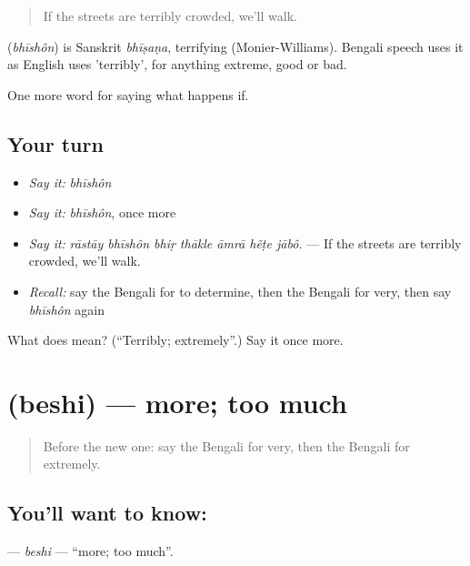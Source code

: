 \begin{quote}
If the streets are terribly crowded, we'll walk.
\end{quote}

\begin{cousinweb}
\textbf{} (\emph{bhīshôn}) is Sanskrit \emph{bhīṣaṇa}, terrifying (Monier-Williams). Bengali speech uses it as English uses 'terribly', for anything extreme, good or bad.
\end{cousinweb}

\begin{grammarlens}[title={What you've built}]
One more word for saying what happens if.
\end{grammarlens}

\subsection*{Your turn}
\begin{itemize}
\raggedright
  \item \emph{Say it:} \emph{bhīshôn}
  \item \emph{Say it:} \emph{bhīshôn}, once more
  \item \emph{Say it:} \emph{rāstāy bhīshôn bhiṛ thākle āmrā hẽṭe jābô.} — If the streets are terribly crowded, we'll walk.
  \item \emph{Recall:} say the Bengali for to determine, then the Bengali for very, then say \emph{bhīshôn} again
\end{itemize}

\begin{tcolorbox}[breakable,colback=teal!4,colframe=teal!35!black,title={Before you move on}]
What does  mean? (\textquotedblleft{}Terribly; extremely\textquotedblright{}.) Say it once more.
\end{tcolorbox}
\section[\texorpdfstring{\bn{বেশি} (beshi)}{বেশি (beshi)}]{ (beshi) — more; too much}

\label{lesson:BN-C370-beshi}



\begin{quote}
Before the new one: say the Bengali for very, then the Bengali for extremely.
\end{quote}

\subsection*{You'll want to know: }
\textbf{} — \emph{beshi} — \textquotedblleft{}more; too much\textquotedblright{}.

